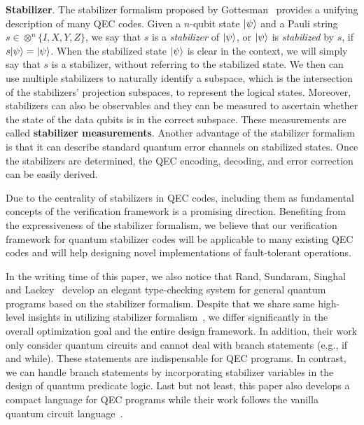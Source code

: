 \noindent\textbf{Stabilizer}. 
The stabilizer formalism proposed by Gottesman~\cite{Gottesman1997StabilizerCA} provides a unifying description of many QEC codes. 
Given a $n$-qubit state $\vert \psi \rangle$ and a Pauli string $s \in \otimes^n \{I,X,Y,Z\}$, %
 we say that $s$ is a \textit{stabilizer} of $\vert \psi \rangle$, or $\vert \psi \rangle$ is \textit{stabilized} by $s$, if $s\vert \psi \rangle = \vert \psi \rangle$.
 When the stabilized state $\vert \psi \rangle$ is clear in the context, we will simply say that $s$ is a stabilizer, without referring to the stabilized state. 
We then can use multiple stabilizers to naturally identify a subspace, which is the intersection of the stabilizers' projection subspaces, to represent the logical states.
Moreover, stabilizers can also be observables and they can be measured to ascertain whether the state of the data qubits is in the correct subspace. 
These measurements are called \textbf{stabilizer measurements}. 
Another advantage of the stabilizer formalism is that it can describe standard quantum error channels on stabilized states.
Once the stabilizers are determined, the QEC encoding, decoding, and error correction can be easily derived.

Due to the centrality of stabilizers in QEC codes, including them as fundamental concepts of the verification framework is a promising direction. 
Benefiting from the expressiveness of the stabilizer formalism, we believe that our verification framework for quantum stabilizer codes will be applicable to many existing QEC codes and will help designing novel implementations of fault-tolerant operations. 

In the writing time of this paper, we also notice that Rand, Sundaram, Singhal and Lackey~\cite{Rand2021StaticAO, Rand2021ExtendingGT, Rand2021GottesmanTF} develop an elegant type-checking system for 
general quantum programs based on the stabilizer formalism. %
Despite that we share same high-level insights in utilizing stabilizer formalism~\cite{Gottesman1997StabilizerCA}, we differ significantly in the overall optimization goal and the entire design framework. 
In addition, their work only consider quantum circuits and cannot deal with branch statements (e.g., if and while). 
These statements are indispensable for QEC programs. 
In contrast, we can handle branch statements by incorporating stabilizer variables in the design of quantum predicate logic. Last but not least, this paper also develops a compact language for QEC programs while their work follows the vanilla quantum circuit language~\cite{nielsen2002quantum}.








